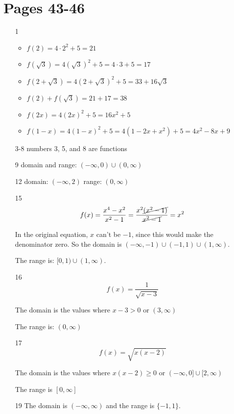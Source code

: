 \documentclass[fleqn,addpoints]{exam}
\begin{document}
\section{Pages 43-46}
\begin{itemize}

\item[1]
\begin{itemize}
\item $f(2) = 4 \cdot 2^2 + 5 = 21$
\item $f(\sqrt{3}) = 4(\sqrt{3})^2 + 5 = 4 \cdot 3 + 5 = 17$
\item $f(2 + \sqrt{3}) = 4(2 + \sqrt{3})^2 + 5 = 33 + 16 \sqrt{3}$
\item $f(2) + f(\sqrt{3}) = 21 + 17 = 38$
\item $f(2x) = 4(2x)^2 + 5 = 16x^2 + 5$
\item $f(1-x) = 4(1-x)^2 + 5 = 4(1-2x+x^2) + 5 = 4x^2-8x+9$
\end{itemize}

\item[3-8]
numbers 3, 5, and 8 are functions

\item[9]
domain and range: $(-\infty, 0) \cup (0, \infty)$

\item[12]
domain: $(-\infty, 2)$
range: $(0, \infty)$

\item[15]
\[
  f(x) = \frac{x^4-x^2}{x^2-1} = \frac{x^2\cancel{(x^2-1)}}{\cancel{x^2-1}} = x^2
\]

In the original equation, $x$ can't be $-1$, since this would make the denominator zero.  So the domain is $(-\infty, -1) \cup (-1, 1) \cup (1, \infty)$.

The range is: $[0, 1) \cup (1, \infty)$.

\item[16]
\[
  f(x) = \frac{1}{\sqrt{x-3}}
\]

The domain is the values where $x-3>0$ or $(3, \infty)$

The range is: $(0, \infty)$

\item[17]
\[
  f(x) = \sqrt{x(x-2)}
\]

The domain is the values where $x(x-2) \geq 0$ or $(-\infty, 0] \cup [2, \infty)$

The range is $[0, \infty]$

\item[19]
The domain is $(-\infty, \infty)$ and the range is $\{-1, 1\}$.


\end{itemize}
\end{document}
